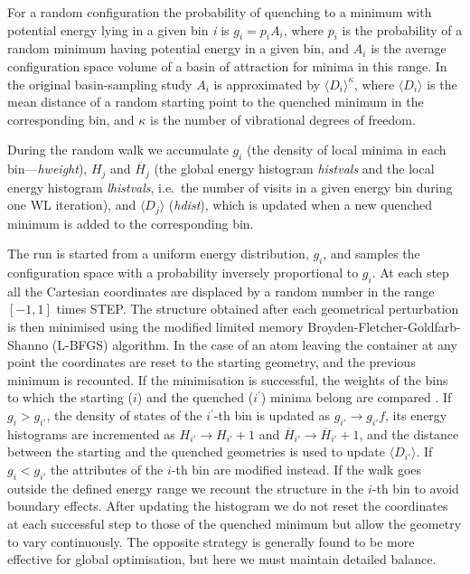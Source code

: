 \documentclass[12pt,a4paper,dvips]{article}
\begin{document}
For a random configuration the probability of quenching to a minimum with potential energy 
lying in a given bin {\it i}  is
$g_i=p_i A_i$, where $p_i$ is the probability of a random minimum having potential
energy in a given bin, and $A_i$ is the average configuration space volume
of a basin of attraction for minima in this range. In the original
basin-sampling study $A_i$ is approximated by 
$\langle D_i \rangle ^{\kappa} $, 
where $\langle D_i \rangle$ is  the mean distance of a random starting point to the quenched minimum in the
corresponding bin, and  $\kappa$ is the number of vibrational degrees of freedom. 

During the random walk we accumulate
$g_i$ (the density of local minima in each bin---{\it hweight}), 
$H_j$ and $\overline{H}_j$ (the global energy histogram {\it histvals} and the
local energy histogram {\it lhistvals}, i.e.~the
number of visits in a given energy bin during one WL iteration), 
and $\langle D_j\rangle$ ({\it hdist}), which is updated when a new quenched minimum is added
to the corresponding bin. 

The run is started from a uniform energy distribution, $g_i$, 
and samples the configuration space with a probability inversely
proportional to $g_i$.
At each step all the Cartesian coordinates are displaced by a random number in the
range $[-1,1]$ times STEP.
The structure obtained after each geometrical perturbation is then minimised
using the modified limited memory Broyden-Fletcher-Goldfarb-Shanno (L-BFGS) algorithm\cite{lbfgs}. 
In the case of an atom leaving the container at any point the coordinates are 
reset to the starting geometry, and the previous minimum is recounted.  If the
minimisation is successful, the weights of the bins to which the starting ($i$) 
and the quenched ($i^\prime$) minima belong are compared . If
$g_i > g_{i'}$, the density of states of the
$i^\prime$-th bin is updated as $g_{i'} \rightarrow g_{i'} f$,
its energy histograms are incremented as  
$H_{i'} \rightarrow H_{i'} +1$ and $\overline{H}_{i'} \rightarrow \overline{H}_{i'} +1$, and the distance
between the starting and the quenched geometries is used to update $\langle D_{i'}\rangle$.
If $g_i < g_{i'}$  the attributes of the  $i$-th bin are modified instead. 
If the walk goes outside the defined energy range
we recount the structure in the $i$-th bin to avoid boundary effects.  After updating the histogram
we do not reset the coordinates at each successful step to those of the quenched minimum 
but allow the geometry to vary
continuously. The opposite strategy is generally found to be more effective for global optimisation, 
but here we must maintain detailed balance.
\end{document}
